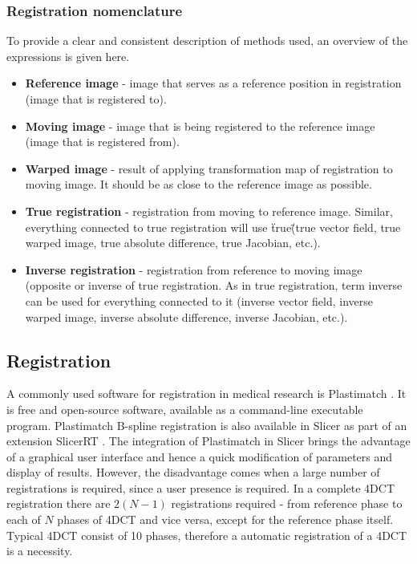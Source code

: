 \documentclass[type=dr, dr=rernat, accentcolor=tud7b,colorbacktitle, bigchapter, openright, twoside, 12pt ]{tudthesis}
\begin{document}
\subsubsection{Registration nomenclature}

To provide a clear and consistent description of methods used, an overview of the expressions is given here.

\begin{itemize}
 \item \textbf{Reference image} - image that serves as a reference position in registration (image that is registered to).
 \item \textbf{Moving image} - image that is being registered to the reference image (image that is registered from).
 \item \textbf{Warped image} - result of applying transformation map of registration to moving image. It should be as close to the reference image as possible.
 \item \textbf{True registration} - registration from moving to reference image. Similar, everything connected to true registration will use \"true\" (true vector field, true warped image, true absolute difference, true Jacobian, etc.).
 \item \textbf{Inverse registration} - registration from reference to moving image (opposite or inverse of true registration. As in true registration, term inverse can be used for everything connected to it (inverse vector field, inverse warped image, inverse absolute difference, inverse Jacobian, etc.).
\end{itemize}


\subsection{Registration}
\label{Registration}

A commonly used software for registration in medical research is Plastimatch \cite{Shackleford2010}. It is free and open-source software, available as a command-line executable program. 
Plastimatch B-spline registration is also available in Slicer as part of an extension SlicerRT \cite{Pinter2012}.
The integration of Plastimatch in Slicer brings the advantage of a graphical user interface and hence a quick modification of parameters and display of results. However, the disadvantage comes when a large number of registrations is required,
since a user presence is required. In a complete 4DCT registration there are $2(N-1)$ registrations required - from reference phase to each of $N$ phases of 4DCT and vice versa, except for the reference phase itself. 
Typical 4DCT consist of 10 phases, therefore a automatic registration of a 4DCT is a necessity.
\end{document}
